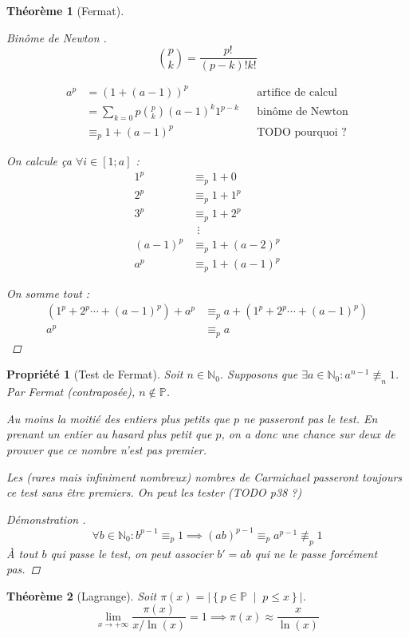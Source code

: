 \documentclass[11pt,twocolumn]{article}
\theoremstyle{plain}
\newtheorem{pr}{Propriété}
\newtheorem{thm}{Théorème}
\newcommand{\esP}{\mathbb{P}} %
\newcommand{\esN}{\mathbb{N}} %
\newenvironment{cproof}[1]{\begin{proof}[Démonstration \cite{#1}]}{\end{proof}}
\begin{document}
\begin{thm}[Fermat]
\begin{proof}[Binôme de Newton \cite{Buys}]
		\[
			\binom p k = \frac{p!}{\left(p-k\right)!k!}
		\]

		\begin{align*}
			a^p
			&= \left(1+\left(a-1\right)\right)^p && \text{artifice de calcul} \\
			&= \sum_{k=0}p \binom pk(a-1)^k1^{p-k} && \text{binôme de Newton} \\
			&\equiv_p 1 + (a-1)^p && \text{TODO pourquoi ?}
		\end{align*}

		On calcule ça $\forall i \in [1;a]$ :
		\begin{align*}
			1^p &\equiv_p 1+0 \\
			2^p &\equiv_p 1+1^p \\
			3^p &\equiv_p 1+2^p \\
			& ~~\vdots \\
			(a-1)^p &\equiv_p 1+(a-2)^p \\
			a^p &\equiv_p 1+(a-1)^p
		\end{align*}

		On somme tout :
		\begin{align*}
			\left(1^p + 2^p \cdots + (a-1)^p\right) + a^p
				&\equiv_p a + \left(1^p + 2^p \cdots + (a-1)^p\right) \\
			a^p &\equiv_p a
		\end{align*}
	\end{proof}
\end{thm}
\begin{pr}[Test de Fermat]
	Soit $n \in \esN_0$.
	Supposons que $\exists a \in \esN_0 : a^{n-1} \not\equiv_n 1$.
	Par Fermat (contraposée), $n \not\in \esP$.

	Au moins la moitié des entiers plus petits que $p$ ne passeront pas le test.
	En prenant un entier au hasard plus petit que $p$, on a donc une chance
	sur deux de prouver que ce nombre n'est pas premier.

	Les (rares mais infiniment nombreux) nombres de Carmichael
	passeront toujours ce test sans être premiers.
	On peut les tester (TODO p38 ?)
	\begin{cproof}{Gillis}
		\[
			\forall b \in \esN_0 : b^{p-1}\equiv_p1
			\implies
			(ab)^{p-1} \equiv_p a^{p-1} \not\equiv_p 1
		\]
		À tout $b$ qui passe le test, on peut associer $b'=ab$
		qui ne le passe forcément pas.
	\end{cproof}
\end{pr}
\begin{thm}[Lagrange]
	Soit $\pi(x)=\left|\left\{p\in\esP \; \middle| \; p\leq x \right\}\right|$.
	\[
		\lim_{x\to+\infty}\frac{\pi(x)}{x/\ln(x)}=1
		\implies
		\pi(x) \approx \frac x{\ln(x)}
	\]
\end{thm}
\end{document}
